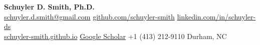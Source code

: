 
\newcommand{\Address}{Durham, NC 27713}
\newcommand{\Phone}{+1-(413)-212-9110}
\newcommand{\EMail}{schuyler.d.smith@gmail.com}
\newcommand{\GitHub}{https://github.com/schuyler-smith}
\newcommand{\LinkedIn}{https://linkedin.com/in/schuyler-ds}
\newcommand{\WebPage}{https://schuyler-smith.github.io/}
\newcommand{\ScholarPage}{https://scholar.google.com/citations?user=fTKo_RgAAAAJ\&hl=en\&oi=sra}

\noindent
\textbf{\LARGE Schuyler D. Smith, Ph.D.} \\
\vspace{0.2cm}
\faEnvelope\hspace{0.2em} \href{mailto:schuyler.d.smith@gmail.com}{schuyler.d.smith@gmail.com} \quad
\faGithub\hspace{0.2em} \href{https://github.com/schuyler-smith}{github.com/schuyler-smith} \quad
\faLinkedin\hspace{0.2em} \href{https://linkedin.com/in/schuyler-ds}{linkedin.com/in/schuyler-ds} \\
\faGlobe\hspace{0.2em} \href{https://schuyler-smith.github.io/}{schuyler-smith.github.io} \quad
\aiGoogleScholar\hspace{0.2em} \href{https://scholar.google.com/citations?user=fTKo_RgAAAAJ&hl=en&oi=sra}{Google Scholar} \quad
\faPhone\hspace{0.2em} +1 (413) 212-9110 \quad
\faMapMarker*\hspace{0.2em} Durham, NC

